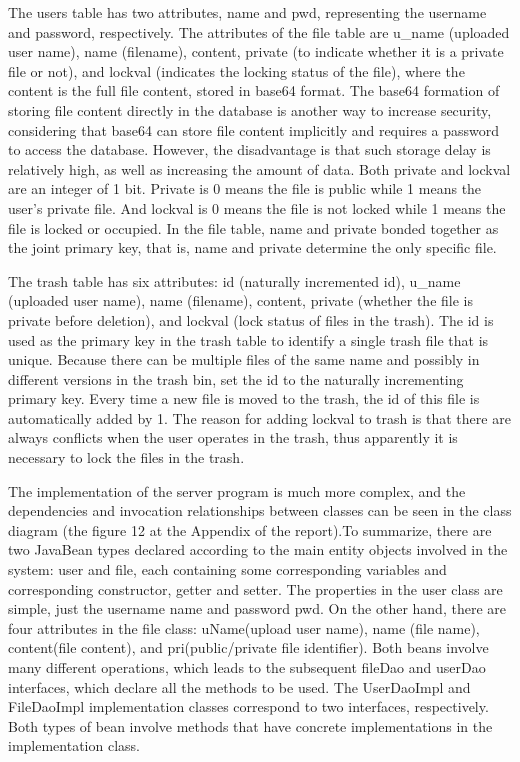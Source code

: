 \documentclass[a4paper,11pt]{article}
\begin{document}
\par The users table has two attributes, name and pwd, representing the username and password, respectively. The attributes of the file table are u\_name (uploaded user name), name (filename), content, private (to indicate whether it is a private file or not), and lockval (indicates the locking status of the file), where the content is the full file content, stored in base64 format. The base64 formation of storing file content directly in the database is another way to increase security, considering that base64 can store file content implicitly and requires a password to access the database. However, the disadvantage is that such storage delay is relatively high, as well as increasing the amount of data. Both private and lockval are an integer of 1 bit. Private is 0 means the file is public while 1 means the user's private file. And lockval is 0 means the file is not locked while 1 means the file is locked or occupied. In the file table, name and private bonded together as the joint primary key, that is, name and private determine the only specific file.

\par The trash table has six attributes: id (naturally incremented id), u\_name (uploaded user name), name (filename), content, private (whether the file is private before deletion), and lockval (lock status of files in the trash). The id is used as the primary key in the trash table to identify a single trash file that is unique. Because there can be multiple files of the same name and possibly in different versions in the trash bin, set the id to the naturally incrementing primary key. Every time a new file is moved to the trash, the id of this file is automatically added by 1. The reason for adding lockval to trash is that there are always conflicts when the user operates in the trash, thus apparently it is necessary to lock the files in the trash.

\par The implementation of the server program is much more complex, and the dependencies and invocation relationships between classes can be seen in the class diagram (the figure 12 at the Appendix of the report).To summarize, there are two JavaBean types declared according to the main entity objects involved in the system: user and file, each containing some corresponding variables and corresponding constructor, getter and setter. The properties in the user class are simple, just the username name and password pwd. On the other hand, there are four attributes in the file class: uName(upload user name), name (file name), content(file content), and pri(public/private file identifier). Both beans involve many different operations, which leads to the subsequent fileDao and userDao interfaces, which declare all the methods to be used. The UserDaoImpl and FileDaoImpl implementation classes correspond to two interfaces, respectively. Both types of bean involve methods that have concrete implementations in the implementation class.
\end{document}
